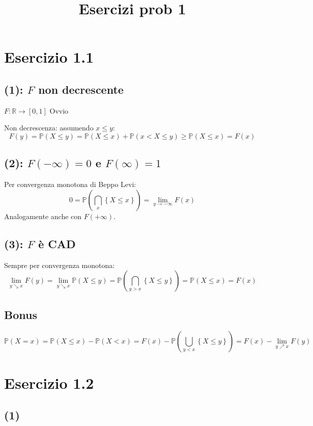 \documentclass{article}
\title{Esercizi prob 1}
\begin{document}
\maketitle
\section{Esercizio 1.1}
\subsection{(1): $F$ non decrescente}
$F: \mathbb{R}\rightarrow \left[0,1\right]$ Ovvio

Non decrescenza: assumendo $x\leq y$:
\[
	F(y)= \mathbb{P}\left(X\leq y\right) = \mathbb{P}\left(X\leq x\right)
	+ \mathbb{P}
	\left(x < X \leq y \right)
	\geq
	\mathbb{P}\left(X\leq x\right) = F(x)
\]

\subsection{(2): $F(-\infty )=0$ e $F(\infty )=1$}
Per convergenza monotona di Beppo Levi:
\[
	0 = \mathbb{P}\left(\bigcap_x \left\{X\leq x\right\}\right) = \lim_{y\rightarrow -\infty} F(x)
\]
Analogamente anche con $F(+\infty)$.

\subsection{(3): $F$ è CAD}
Sempre per convergenza monotona:
\[
	\lim_{y \searrow x} F(y) = \lim_{y \searrow x}\mathbb{P}\left(X\leq y\right) = \mathbb{P} \left(\bigcap_{y>x}\left\{X\leq y\right\}\right) = \mathbb{P}(X\leq x) = F(x)
\]
\begin{comment}
\[
	F(x) = \mathbb{P}\left(X\leq x\right)	
\]
\end{comment}

\subsection{Bonus}
\[
	\mathbb{P}\left(X=x\right) = \mathbb{P}\left(X\leq x\right) - \mathbb{P}\left(X<x\right) = F(x) - \mathbb{P}\left(\bigcup_{y<x} \left\{X\leq y\right\}\right) = F(x) - \lim_{y \nearrow x} F(y)
\]


\section{Esercizio 1.2}
\subsection{(1)}
\end{document}

